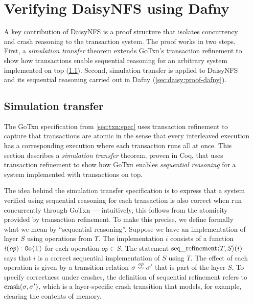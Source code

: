 \section{Verifying DaisyNFS using Dafny}
\label{sec:daisy:proof}

A key contribution of DaisyNFS is a proof structure that isolates concurrency and crash
reasoning to the transaction system. The proof works in two steps. First, a
\emph{simulation transfer} theorem extends GoTxn's transaction refinement to show
how transactions enable sequential reasoning for an arbitrary system implemented on
top (\cref{sec:daisy:simulation-transfer}). Second, simulation transfer is
applied to DaisyNFS and its sequential reasoning carried out in Dafny
(\cref{sec:daisy:proof-dafny}).

\subsection{Simulation transfer}%
\label{sec:daisy:simulation-transfer}

The GoTxn specification from \cref{sec:txn:spec} uses transaction refinement to
capture that transactions are atomic in the sense that every interleaved
execution has a corresponding execution where each transaction runs all at once.
This section describes a \emph{simulation transfer} theorem, proven in Coq, that
uses transaction refinement to show how GoTxn enables \emph{sequential
reasoning} for a system implemented with transactions on top.

The idea behind the simulation transfer specification is to express that a system
verified using sequential reasoning for each transaction is also correct when
run concurrently through GoTxn --- intuitively, this follows from the atomicity
provided by transaction refinement.
To make this precise, we define formally what we mean by
``sequential reasoning''. Suppose we have an
implementation of layer $S$ using operations from $T$. The implementation $i$
consists of a function $i(\mathit{op}) : \mathtt{Go}\langle \mathrm{T} \rangle$ for each operation $op \in S$. The statement
$\operatorname{seq\_refinement} \langle T, S \rangle(i)$ says that $i$ is a correct sequential
implementation of $S$ using $T$. The effect of each operation is given by a
transition relation $\sigma \overset{\mathit{op}}{\leadsto} \sigma'$ that is part of the layer
$S$. To specify correctness under crashes, the
definition of sequential refinement refers to $\operatorname{crash}(\sigma, \sigma')$, which is a
layer-specific crash transition that models, for example, clearing the
contents of memory.

